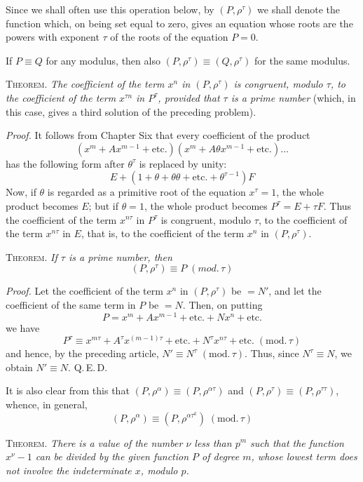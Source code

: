 Since we shall often use this operation below, by $(P,\rho^\tau)$
we shall denote the function which, on being set equal to zero, gives an equation whose roots are the powers with exponent $\tau$ of the roots of the equation $P=0$.

If $P\equiv Q$ for any modulus, then also $(P,\rho^\tau)\equiv(Q,\rho^\tau)$ for the same modulus.

\textsc{Theorem.} \emph{The coefficient of the term $x^n$ in $(P,\rho^\tau)$ is congruent, modulo $\tau$, to the coefficient of the term $x^{\tau n}$ in $P^\tau$, provided that $\tau$ is a prime number} (which, in this case, gives a third solution of the preceding problem).

\emph{Proof.} It follows from Chapter Six that every coefficient of the product
\[
(x^m+Ax^{m-1}+\text{etc.})(x^m+A\theta x^{m-1}+\text{etc.})\ldots
\]
has the following form after $\theta^\tau$ is replaced by unity:
\[
E+(1+\theta+\theta\theta+\text{etc.}+\theta^{\tau-1})F
\]
Now, if $\theta$ is regarded as a primitive root of the equation $x^\tau=1$, the whole product becomes $E$; but if $\theta=1$, the whole product becomes $P^\tau=E+\tau F$. Thus the coefficient of the term $x^{n\tau}$ in $P^\tau$ is congruent, modulo $\tau$, to the coefficient of the term $x^{n\tau}$ in $E$, that is, to the coefficient of the term $x^n$ in $(P,\rho^\tau)$.

\textsc{Theorem.} \emph{If $\tau$ is a prime number, then}
\[
(P,\rho^\tau)\equiv P\;(\mathit{mod.}\,\tau)
\]

\begingroup{}\relax \emph{Proof.} Let the coefficient of the term $x^n$ in $(P,\rho^\tau)$ be $=N'$, and let the coefficient of the same term in $P$ be $=N$. Then, on putting
\[
P=x^m+Ax^{m-1}+\text{etc.}+Nx^n+\text{etc.}
\]
we have
\[
P^\tau\equiv x^{m\tau}+A^\tau x^{(m-1)\tau}+\text{etc.}+N^\tau x^{n\tau}+\text{etc.}\;(\mathrm{mod.}\,\tau)
\]
and hence, by the preceding article, $N'\equiv N^\tau\;(\mathrm{mod.}\,\tau)$. Thus, since $N^\tau\equiv N$, we obtain $N'\equiv N$. Q.\,E.\,D.\par\endgroup

It is also clear from this that $(P,\rho^\alpha)\equiv(P,\rho^{\alpha\tau})$ and $(P,\rho^\tau)\equiv(P,\rho^{\tau\tau})$, whence, in general,
\[
(P,\rho^\alpha)\equiv(P,\rho^{\alpha\tau^k})\;(\mathrm{mod.}\,\tau)
\]

\textsc{Theorem.} \emph{There is a value of the number $\nu$ less than $p^m$ such that the function $x^\nu-1$ can be divided by the given function $P$ of degree $m$, whose lowest term does not involve the indeterminate $x$, modulo $p$.}


